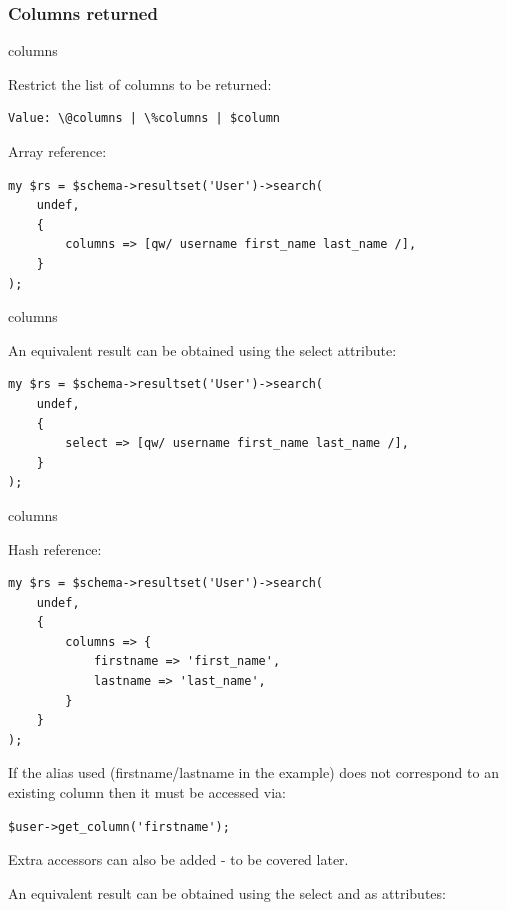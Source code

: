 \subsubsection{Columns returned}
\begin{frame}[fragile]{columns}

Restrict the list of columns to be returned:

\begin{lstlisting}
Value: \@columns | \%columns | $column
\end{lstlisting}

Array reference:

\begin{lstlisting}
my $rs = $schema->resultset('User')->search(
    undef,
    {
        columns => [qw/ username first_name last_name /],
    }
);
\end{lstlisting}
\end{frame}

\begin{frame}[fragile]{columns}

An equivalent result can be obtained using the select attribute:
\begin{lstlisting}
my $rs = $schema->resultset('User')->search(
    undef,
    {
        select => [qw/ username first_name last_name /],
    }
);
\end{lstlisting}
\end{frame}

\begin{frame}[fragile]{columns}

Hash reference:

\begin{lstlisting}
my $rs = $schema->resultset('User')->search(
    undef,
    {
        columns => {
            firstname => 'first_name',
            lastname => 'last_name',
        }
    }
);
\end{lstlisting}
\end{frame}

If the alias used (firstname/lastname in the example) does not correspond to
an existing column then it must be accessed via:

\begin{lstlisting}
$user->get_column('firstname');
\end{lstlisting}

Extra accessors can also be added - to be covered later.

An equivalent result can be obtained using the select and as attributes:

